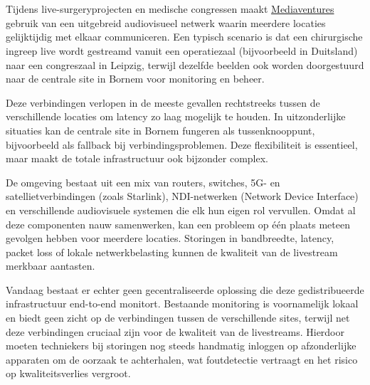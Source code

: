 
\chapter{}%
\label{ch:inleiding}

Tijdens live-surgeryprojecten en medische congressen maakt \href{https://mediaventures.be/}{Mediaventures} gebruik van een uitgebreid audiovisueel netwerk waarin meerdere locaties gelijktijdig met elkaar communiceren. Een typisch scenario is dat een chirurgische ingreep live wordt gestreamd vanuit een operatiezaal (bijvoorbeeld in Duitsland) naar een congreszaal in Leipzig, terwijl dezelfde beelden ook worden doorgestuurd naar de centrale site in Bornem voor monitoring en beheer.

Deze verbindingen verlopen in de meeste gevallen rechtstreeks tussen de verschillende locaties om latency zo laag mogelijk te houden. In uitzonderlijke situaties kan de centrale site in Bornem fungeren als tussenknooppunt, bijvoorbeeld als fallback bij verbindingsproblemen. Deze flexibiliteit is essentieel, maar maakt de totale infrastructuur ook bijzonder complex.

De omgeving bestaat uit een mix van routers, switches, 5G- en satellietverbindingen (zoals Starlink), NDI-netwerken (Network Device Interface) en verschillende audiovisuele systemen die elk hun eigen rol vervullen. Omdat al deze componenten nauw samenwerken, kan een probleem op één plaats meteen gevolgen hebben voor meerdere locaties. Storingen in bandbreedte, latency, packet loss of lokale netwerkbelasting kunnen de kwaliteit van de livestream merkbaar aantasten.

Vandaag bestaat er echter geen gecentraliseerde oplossing die deze gedistribueerde infrastructuur end-to-end monitort. Bestaande monitoring is voornamelijk lokaal en biedt geen zicht op de verbindingen tussen de verschillende sites, terwijl net deze verbindingen cruciaal zijn voor de kwaliteit van de livestreams. Hierdoor moeten techniekers bij storingen nog steeds handmatig inloggen op afzonderlijke apparaten om de oorzaak te achterhalen, wat foutdetectie vertraagt en het risico op kwaliteitsverlies vergroot.

\section{}%
\label{sec:probleemstelling}

